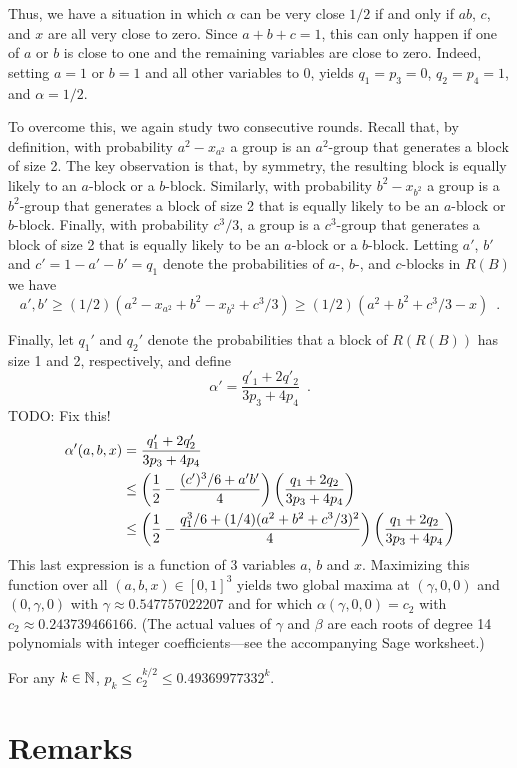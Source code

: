 \documentclass{patmorin}
\begin{document}
Thus, we have a situation in which $\alpha$ can be very close $1/2$
if and only if $ab$, $c$, and $x$ are all very close to zero.  Since
$a+b+c=1$, this can only happen if one of $a$ or $b$ is close to one
and the remaining variables are close to zero.  Indeed, setting $a=1$
or $b=1$ and all other variables to 0, yields $q_1=p_3=0$, $q_2=p_4 =
1$, and $\alpha=1/2$.

To overcome this, we again study two consecutive rounds.  Recall that, by
definition, with probability $a^2-x_{a^2}$ a group is an $a^2$-group that
generates a block of size 2.  The key observation is that, by symmetry,
the resulting block is equally likely to an $a$-block or a $b$-block.
Similarly, with probability $b^2-x_{b^2}$ a group is a $b^2$-group
that generates a block of size 2 that is equally likely to be an
$a$-block or $b$-block.  Finally, with probability $c^3/3$, a group is
a $c^3$-group that generates a block of size 2 that is equally likely to
be an $a$-block or a $b$-block.  Letting $a'$, $b'$ and $c'=1-a'-b'=q_1$
denote the probabilities of $a$-, $b$-, and $c$-blocks in $R(B)$ we have
\[
   a',b' \ge (1/2)(a^2-x_{a^2}+b^2-x_{b^2}+c^3/3)\ge (1/2)(a^2+b^2+c^3/3-x)  \enspace .
\]  


Finally, let $q_1'$ and $q_2'$ denote the probabilities that a block
of $R(R(B))$ has size 1 and 2, respectively, and define 
\[
    \alpha' = \frac{q'_1+2q'_2}{3p_3 + 4p_4} \enspace .
\]
TODO: Fix this!
\begin{align}
    \alpha'(a,b,x) & = \frac{q'_1+2q'_2}{3p_3 + 4p_4} \\
            & \le \left(\frac{1}{2}-\frac{(c')^3/6+a'b'}{4}\right)
               \left(\frac{q_1+2q_2}{3p_3+4p_4} \right) \\
            & \le \left(\frac{1}{2}-\frac{q_1^3/6+(1/4)(a^2 + b^2 + c^3/3)^2}{4}\right)
               \left(\frac{q_1+2q_2}{3p_3+4p_4} \right) 
               \eqlabel{ap} 
\end{align}
This last expression is a function of 3 variables $a$, $b$ and $x$.
Maximizing this function over all $(a,b,x)\in[0,1]^3$ yields two global
maxima at $(\gamma,0,0)$ and $(0,\gamma,0)$ with $\gamma\approx0.547757022207$ and for which $\alpha(\gamma,0,0)=c_2$ with $c_2\approx 0.243739466166$. (The actual values of $\gamma$ and $\beta$ are each roots of degree 14 polynomials with integer coefficients---see the accompanying Sage worksheet.)

\begin{thm}
   For any $k\in\mathbb{N}$, $p_{k} \le c_2^{k/2} \le 0.49369977332^k$.
\end{thm}

\section{Remarks}



\end{document}
